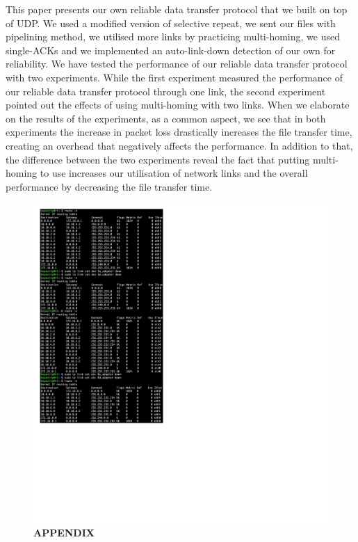 \documentclass[conference]{IEEEtran}
\begin{document}
    This paper presents our own reliable data transfer protocol that we built on top of UDP. We used a modified version of selective repeat, we sent our files with pipelining method, we utilised more links by practicing multi-homing, we used single-ACKs and we implemented an auto-link-down detection of our own for reliability. We have tested the performance of our reliable data transfer protocol with two experiments. While the first experiment measured the performance of our reliable data transfer protocol through one link, the second experiment pointed out the effects of using multi-homing with two links. When we elaborate on the results of the experiments, as a common aspect, we see that in both experiments the increase in packet loss drastically increases the file transfer time, creating an overhead that negatively affects the performance. In addition to that, the difference between the two experiments reveal the fact that putting multi-homing to use increases our utilisation of network links and the overall performance by decreasing the file transfer time.




    
    
\begin{figure}[t]
\caption*{\textbf{APPENDIX}}
\centerline{\includegraphics[width=360pt]{screenshots.pdf}}
\label{graph}
\end{figure}
\end{document}
